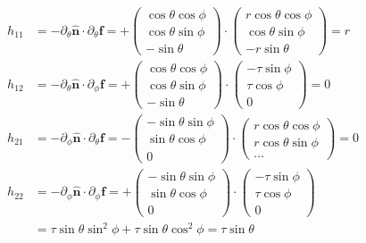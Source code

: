 \documentclass[11pt, DINA4, fleqn]{amsart}
\def\vn{\boldsymbol{n}\xspace}
\def\vf{\boldsymbol{f}\xspace}
\begin{document}
\begin{align}
h_{11} &= -\partial_{\theta} \hat{\vn} \cdot \partial_{\theta} \vf =
+ \begin{pmatrix}
\cos \theta \cos\phi \\
\cos \theta \sin\phi \\
-\sin \theta
\end{pmatrix}
\cdot
\begin{pmatrix}
r\cos \theta \cos\phi \\
\cos \theta \sin\phi \\
-r\sin \theta
\end{pmatrix} = r \\
h_{12} &= -\partial_{\theta} \hat{\vn} \cdot \partial_{\phi} \vf =
+ \begin{pmatrix}
\cos \theta \cos\phi \\
\cos \theta \sin\phi \\
-\sin \theta
\end{pmatrix}
\cdot
\begin{pmatrix}
-\tau \sin\phi \\
\tau \cos\phi \\
0
\end{pmatrix} = 0 \\
h_{21} &= -\partial_{\phi} \hat{\vn} \cdot \partial_{\theta} \vf =
- \begin{pmatrix}
-\sin \theta \sin\phi \\
\sin \theta \cos\phi \\
0
\end{pmatrix}
\cdot
\begin{pmatrix}
r \cos \theta\cos\phi \\
r \cos\theta \sin\phi \\
\dots
\end{pmatrix} = 0 \\
h_{22} &= -\partial_{\phi} \hat{\vn} \cdot \partial_{\phi} \vf =
+ \begin{pmatrix}
-\sin \theta \sin\phi \\
\sin \theta \cos\phi \\
0
\end{pmatrix}
\cdot
\begin{pmatrix}
-\tau \sin \phi \\
\tau \cos\phi \\
0
\end{pmatrix} \\
&= \tau\sin \theta\sin^2\phi + \tau \sin\theta \cos^2\phi = \tau \sin \theta
\end{align}
\end{document}

